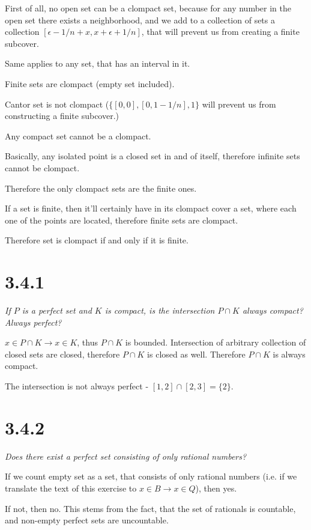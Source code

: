 \documentclass[11pt,oneside,titlepage]{article}
\begin{document}
First of all, no open set can be a clompact set, because for any number
in the open set there
exists a neighborhood, and we add to a collection of sets a collection
$[\epsilon - 1/n + x, x + \epsilon + 1/n]$, that will prevent us from
creating a finite subcover.

Same applies to any set, that has an interval in it.

Finite sets are clompact (empty set included).

Cantor set is not clompact
($\{[0, 0], [0, 1 - 1/n], 1 \}$ will prevent us from constructing a finite
subcover.)

Any compact set cannot be a clompact.

Basically, any isolated point is a closed set in and of itself, therefore
infinite sets cannot be clompact.

Therefore the only clompact sets are the finite ones.

If a set is finite, then it'll certainly have in its clompact cover a set, where
each one of the points are located, therefore finite sets are clompact.

Therefore set is clompact if and only if it is finite.


\section*{3.4.1}
\textit{If $P$ is a perfect set and $K$ is compact, is the intersection
  $P \cap K$ always compact? Always perfect?}

$x \in P \cap K \to x \in K$, thus $P \cap K$ is bounded. Intersection of
arbitrary collection of closed sets are closed, therefore $P \cap K$ is
closed as well. Therefore $P \cap K$ is always compact.

The intersection is not always perfect - $[1, 2] \cap [2, 3] = \{2\}$.

\section*{3.4.2}
\textit{Does there exist a perfect set consisting of only rational numbers?}

If we count empty set as a set, that consists of only rational numbers
(i.e. if we translate the text of this exercise to $x \in B \to x \in Q$),
then yes.

If not, then no. This stems from the fact, that the set of rationals is
countable, and non-empty perfect sets are uncountable.
\end{document}
